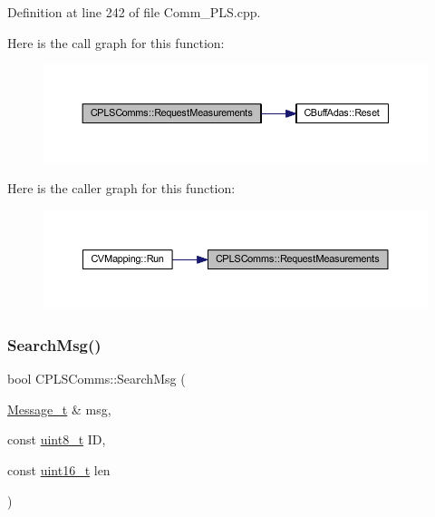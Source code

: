 Definition at line 242 of file Comm\+\_\+\+P\+L\+S.\+cpp.

Here is the call graph for this function\+:
\nopagebreak
\begin{figure}[H]
\begin{center}
\leavevmode
\includegraphics[width=350pt]{class_c_p_l_s_comms_ab69a49f5c4cd7b4b9f63fa16c7792920_cgraph}
\end{center}
\end{figure}
Here is the caller graph for this function\+:
\nopagebreak
\begin{figure}[H]
\begin{center}
\leavevmode
\includegraphics[width=350pt]{class_c_p_l_s_comms_ab69a49f5c4cd7b4b9f63fa16c7792920_icgraph}
\end{center}
\end{figure}
\mbox{\label{class_c_p_l_s_comms_a14754b4119b9a3d613579c2a80220cc0}} 
\subsubsection{\texorpdfstring{SearchMsg()}{SearchMsg()}}
{\footnotesize\ttfamily bool C\+P\+L\+S\+Comms\+::\+Search\+Msg (\begin{DoxyParamCaption}\item[{\mbox{\hyperlink{struct_c_p_l_s_comms_1_1_message__t}{Message\+\_\+t}} \&}]{msg,  }\item[{const \mbox{\hyperlink{_a_d_a_s___types_8h_aba7bc1797add20fe3efdf37ced1182c5}{uint8\+\_\+t}}}]{ID,  }\item[{const \mbox{\hyperlink{_a_d_a_s___types_8h_a1f1825b69244eb3ad2c7165ddc99c956}{uint16\+\_\+t}}}]{len }\end{DoxyParamCaption})}




